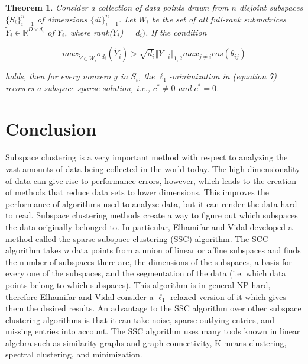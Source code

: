 \documentclass{article}
\newcommand{\R}{\mathbb{R}}
\newtheorem{theorem}{Theorem}[section]
\begin{document}
\begin{theorem}
Consider a collection of data points drawn from $n$ disjoint subspaces $\{S_i\}_{i=1}^n$ of dimensions $\{di\}_{i=1}^n$. Let $W_i$ be the set of all full-rank submatrices $\widetilde{Y}_i \in \R^{D \times d_i}$ of $Y_i$, where rank($Y_i$) = $d_i)$. If the condition 

\[ max_{\widetilde{Y} \in W_i}\sigma_{d_i}(\widetilde{Y}_i) > \sqrt{d_i}\left\Vert Y_{-i} \right\Vert_{1,2} max_{j \neq i} cos(\theta_{ij})
\]

holds, then for every nonzero $y$ in $S_i$, the $\ell_1$-minimization in (equation 7) recovers a subspace-sparse solution, i.e., $c^* \neq 0$ and $c_\_^* = 0$.  \cite{elhamifar2012sparse}
\end{theorem}

\section{Conclusion}

\hspace{\parindent}Subspace clustering is a very important method with respect to analyzing the vast amounts of data being collected in the world today. The high dimensionality of data can give rise to performance errors, however, which leads to the creation of methods that reduce data sets to lower dimensions. This improves the performance of algorithms used to analyze data, but it can render the data hard to read. Subspace clustering methods create a way to figure out which subspaces the data originally belonged to. In particular, Elhamifar and Vidal developed a method called the sparse subspace clustering (SSC) algorithm. The SCC algorithm takes $n$ data points from a union of linear or affine subspaces and finds the number of subspaces there are, the dimensions of the subspaces, a basis for every one of the subspaces, and the segmentation of the data (i.e. which data points belong to which subspaces). This algorithm is in general NP-hard, therefore Elhamifar and Vidal consider a $\ell_1$ relaxed version of it which gives them the desired results. An advantage to the SSC algorithm over other subspace clustering algorithms is that it can take noise, sparse outlying entries, and missing entries into account. The SSC algorithm uses many tools known in linear algebra such as similarity graphs and graph connectivity, K-means clustering, spectral clustering, and minimization. 
\end{document}
